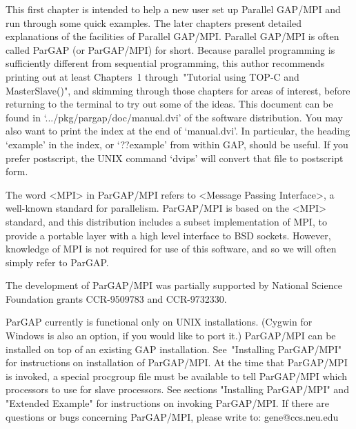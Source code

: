 %
%
%
%

\hfuzz=5pt %
\overfullrule=0pt %


This first chapter is intended to help a new user set up
Parallel GAP/MPI and run through some quick examples.  The later
chapters present detailed explanations of the facilities of
Parallel GAP/MPI.  Parallel GAP/MPI is often called ParGAP
(or ParGAP/MPI) for short.  Because parallel programming is sufficiently
different from sequential programming, this author recommends printing
out at least Chapters~1 through~"Tutorial using TOP-C and MasterSlave()",
and skimming through  those chapters for areas of interest, before
returning to the terminal to try out some of the ideas.
This document can be found in `.../pkg/pargap/doc/manual.dvi'
of the software distribution.  You may also want to print the index
at the end of `manual.dvi'.  In particular, the heading `example'
in the index, or `??example' from within GAP, should be useful.
If you prefer postscript, the UNIX command `dvips' will convert
that file to postscript form.

The word <MPI> in ParGAP/MPI refers to <Message Passing Interface>, a
well-known standard for parallelism.  ParGAP/MPI is based on the <MPI>
standard, and this distribution includes a subset implementation of MPI,
to provide a portable layer with a high level interface to BSD sockets.
However, knowledge of MPI is not required for use of this software, and so
we will often simply refer to ParGAP.

The development of ParGAP/MPI was partially supported by 
National Science Foundation grants CCR-9509783 and CCR-9732330.


ParGAP currently is functional only on UNIX installations.  (Cygwin for
Windows is also an option, if you would like to port it.)  ParGAP/MPI can
be installed on top of an existing GAP installation.  See~"Installing
ParGAP/MPI" for instructions on installation of ParGAP/MPI.  At the time
that ParGAP/MPI is invoked, a special procgroup file must be available to
tell ParGAP/MPI which processors to use for slave processors.  See sections
"Installing ParGAP/MPI" and "Extended Example"
for instructions on invoking ParGAP/MPI.  If there are questions or bugs
concerning ParGAP/MPI, please write to:  gene@ccs.neu.edu

